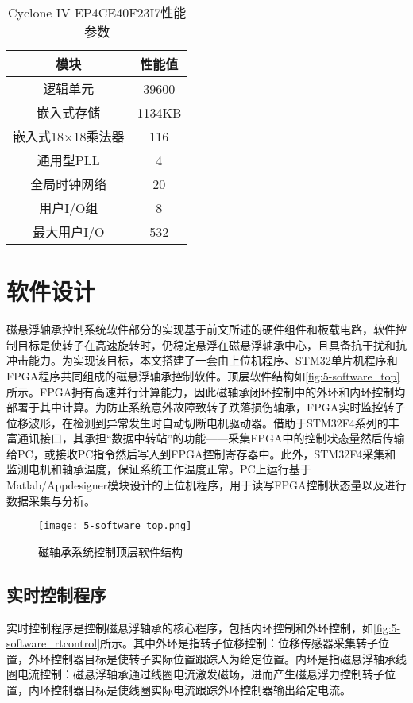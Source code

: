 \begin{table}[htb]
  \caption[Cyclone IV EP4CE40F23I7性能参数]{Cyclone IV EP4CE40F23I7性能参数\label{tab:fpga_para}}
  \begin{tabular}{cc}
    \toprule
    模块 & 性能值 \\
    \midrule
    逻辑单元 & 39600\\
    嵌入式存储 & 1134KB\\
    嵌入式18$\times$18乘法器 & 116\\
    通用型PLL & 4\\
    全局时钟网络 & 20\\
    用户I/O组 & 8\\
    最大用户I/O & 532	\\
    \bottomrule
  \end{tabular}
\end{table}

\section{软件设计}
磁悬浮轴承控制系统软件部分的实现基于前文所述的硬件组件和板载电路，软件控制目标是使转子在高速旋转时，仍稳定悬浮在磁悬浮轴承中心，且具备抗干扰和抗冲击能力。为实现该目标，本文搭建了一套由上位机程序、STM32单片机程序和FPGA程序共同组成的磁悬浮轴承控制软件。顶层软件结构如\autoref{fig:5-software_top}所示。FPGA拥有高速并行计算能力，因此磁轴承闭环控制中的外环和内环控制均部署于其中计算。为防止系统意外故障致转子跌落损伤轴承，FPGA实时监控转子位移波形，在检测到异常发生时自动切断电机驱动器。借助于STM32F4系列的丰富通讯接口，其承担“数据中转站”的功能——采集FPGA中的控制状态量然后传输给PC，或接收PC指令然后写入到FPGA控制寄存器中。此外，STM32F4采集和监测电机和轴承温度，保证系统工作温度正常。PC上运行基于Matlab/Appdesigner模块设计的上位机程序，用于读写FPGA控制状态量以及进行数据采集与分析。
\begin{figure}
	\texttt{[image: 5-software\_top.png]}
	\caption{磁轴承系统控制顶层软件结构}
	\label{fig:5-software_top}
\end{figure}

\subsection{实时控制程序}
实时控制程序是控制磁悬浮轴承的核心程序，包括内环控制和外环控制，如\autoref{fig:5-software_rtcontrol}所示。其中外环是指转子位移控制：位移传感器采集转子位置，外环控制器目标是使转子实际位置跟踪人为给定位置。内环是指磁悬浮轴承线圈电流控制：磁悬浮轴承通过线圈电流激发磁场，进而产生磁悬浮力控制转子位置，内环控制器目标是使线圈实际电流跟踪外环控制器输出给定电流。

